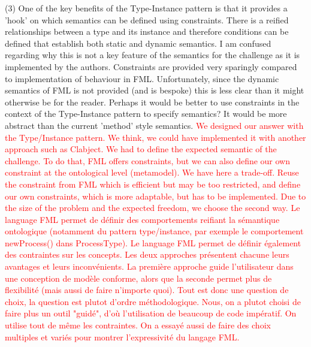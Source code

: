 \documentclass[10pt]{article}
\begin{document}
\begin{response}{(3) One of the key benefits of the Type-Instance pattern is that it provides a 'hook' on which semantics can be defined using constraints. There is a reified relationships between a type and its instance and therefore conditions can be defined that establish both static and dynamic semantics. I am confused regarding why this is not a key feature of the semantics for the challenge as it is implemented by the authors. Constraints are provided very sparingly compared to implementation of behaviour in FML. Unfortunately, since the dynamic semantics of FML is not provided (and is bespoke) this is less clear than it might otherwise be for the reader. Perhaps it would be better to use constraints in the context of the Type-Instance pattern to specify semantics? It would be more abstract than the current 'method' style semantics.} 
\textcolor{red}{
We designed our answer with the Type/Instance pattern. We think, we could have implemented it with another approach such as Clabject.
We had to define the expected semantic of the challenge. To do that, FML offers constraints, but we can also define our own constraint at the ontological level (metamodel). We have here a trade-off. Reuse the constraint from FML which is efficient but may be too restricted, and define our own constraints, which is more adaptable, but has to be implemented. Due to the size of the problem and the expected freedom, we choose the second way. Le language FML permet de définir des comportements reifiant la sémantique ontologique (notamment du pattern type/instance, par exemple le comportement newProcess() dans ProcessType). Le language FML permet de définir également des contraintes sur les concepts. Les deux approches présentent chacune leurs avantages et leurs inconvénients. La première approche guide l'utilisateur dans une conception de modèle conforme, alors que la seconde permet plus de flexibilité (mais aussi de faire n'importe quoi). Tout est donc une question de choix, la question est plutot d'ordre méthodologique. Nous, on a plutot choisi de faire plus un outil "guidé", d'où l'utilisation de beaucoup de code impératif. On utilise tout de même les contraintes. On a essayé aussi de faire des choix multiples et variés pour montrer l'expressivité du langage FML.}

\end{response}
\end{document}
